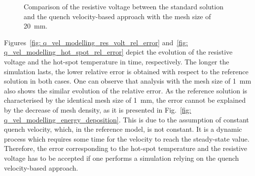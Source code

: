 \begin{figure}[H]
\centering
    \caption{Comparison of the resistive voltage between the standard solution and the quench velocity-based approach with the mesh size of 20~mm.}
    \label{fig: q_vel_modelling_res_volt_benchmarking}
\end{figure}

Figures~\ref{fig: q_vel_modelling_res_volt_rel_error} and~\ref{fig: q_vel_modelling_hot_spot_rel_error} depict the evolution of the resistive voltage and the hot-spot temperature in time, respectively.
The longer the simulation lasts, the lower relative error is obtained with respect to the reference solution in both cases. One can observe that analysis with the mesh size of 1~mm also shows the similar evolution of the relative error. As the reference solution is characterised by the identical mesh size of 1~mm, the error cannot be explained by the decrease of mesh density, as it is presented in Fig.~\ref{fig: q_vel_modelling_energy_deposition}. This is due to the assumption of constant quench velocity, which, in the reference model, is not constant. It is a dynamic process which requires some time for the velocity to reach the steady-state value. Therefore, the error corresponding to the hot-spot temperature and the resistive voltage has to be accepted if one performs a simulation relying on the quench velocity-based approach.

